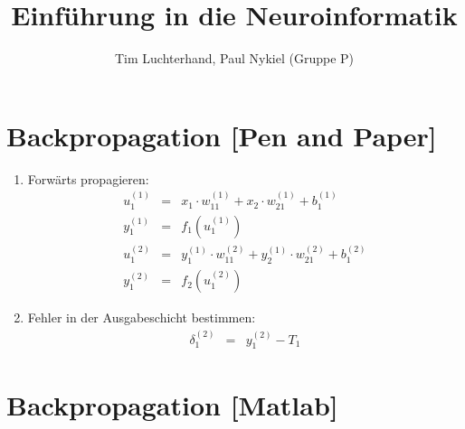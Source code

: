 \documentclass[DIN, pagenumber=false, fontsize=11pt, parskip=half]{scrartcl}
\title{Einführung in die Neuroinformatik}
\author{Tim Luchterhand, Paul Nykiel (Gruppe P)}
\begin{document}
    \maketitle
    \section{Backpropagation [Pen and Paper]}
    \begin{enumerate}
        \item Forwärts propagieren:
            \begin{eqnarray*}
                u_1^{(1)} &=& x_1 \cdot w_{11}^{(1)} + x_2 \cdot w_{21}^{(1)} + b_1^{(1)}\\
                y_1^{(1)} &=& f_1(u_1^{(1)}) \\
                u_1^{(2)} &=& y_1^{(1)} \cdot w_{11}^{(2)} + y_2^{(1)} \cdot w_{21}^{(2)} + b_1^{(2)}\\
                y_1^{(2)} &=& f_2(u_1^{(2)}) 
            \end{eqnarray*}
        \item Fehler in der Ausgabeschicht bestimmen:
            \begin{eqnarray*}
                \delta_1^{(2)} &=& y_1^({2}) - T_1
            \end{eqnarray*}

    \end{enumerate}
    \section{Backpropagation [Matlab]}
\end{document}
